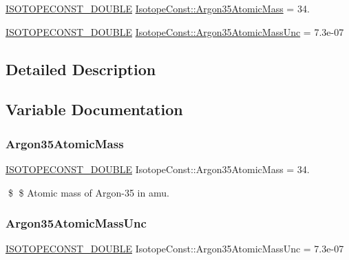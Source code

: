 \begin{DoxyCompactItemize}
\item 
\mbox{\hyperlink{group___isotope_const-_macros_ga8f45a7272ce02c0b4c65c44636ed719a}{I\+S\+O\+T\+O\+P\+E\+C\+O\+N\+S\+T\+\_\+\+D\+O\+U\+B\+LE}} \mbox{\hyperlink{group___isotope_const-_argon-_ar35_ga2470102cdf08c2cd99c57d537460b32e}{Isotope\+Const\+::\+Argon35\+Atomic\+Mass}} = 34.
\item 
\mbox{\hyperlink{group___isotope_const-_macros_ga8f45a7272ce02c0b4c65c44636ed719a}{I\+S\+O\+T\+O\+P\+E\+C\+O\+N\+S\+T\+\_\+\+D\+O\+U\+B\+LE}} \mbox{\hyperlink{group___isotope_const-_argon-_ar35_ga922221d8feca91bba990656b16b0f5e4}{Isotope\+Const\+::\+Argon35\+Atomic\+Mass\+Unc}} = 7.\+3e-\/07
\end{DoxyCompactItemize}


\subsection{Detailed Description}


\subsection{Variable Documentation}
\mbox{\label{group___isotope_const-_argon-_ar35_ga2470102cdf08c2cd99c57d537460b32e}} 
\subsubsection{\texorpdfstring{Argon35\+Atomic\+Mass}{Argon35AtomicMass}}
{\footnotesize\ttfamily \mbox{\hyperlink{group___isotope_const-_macros_ga8f45a7272ce02c0b4c65c44636ed719a}{I\+S\+O\+T\+O\+P\+E\+C\+O\+N\+S\+T\+\_\+\+D\+O\+U\+B\+LE}} Isotope\+Const\+::\+Argon35\+Atomic\+Mass = 34.}

\$ \$ Atomic mass of Argon-\/35 in amu. \mbox{\label{group___isotope_const-_argon-_ar35_ga922221d8feca91bba990656b16b0f5e4}} 
\subsubsection{\texorpdfstring{Argon35\+Atomic\+Mass\+Unc}{Argon35AtomicMassUnc}}
{\footnotesize\ttfamily \mbox{\hyperlink{group___isotope_const-_macros_ga8f45a7272ce02c0b4c65c44636ed719a}{I\+S\+O\+T\+O\+P\+E\+C\+O\+N\+S\+T\+\_\+\+D\+O\+U\+B\+LE}} Isotope\+Const\+::\+Argon35\+Atomic\+Mass\+Unc = 7.\+3e-\/07}

